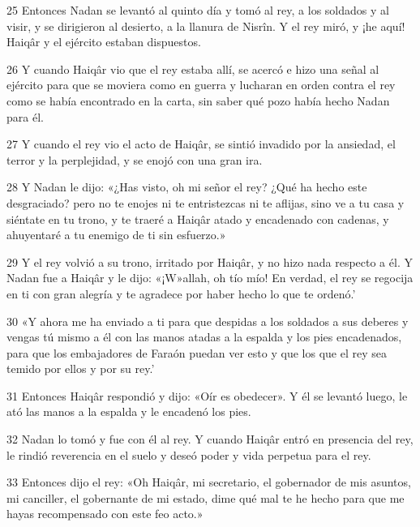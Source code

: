 \par 25 Entonces Nadan se levantó al quinto día y tomó al rey, a los soldados y al visir, y se dirigieron al desierto, a la llanura de Nisrîn. Y el rey miró, y ¡he aquí! Haiqâr y el ejército estaban dispuestos.

\par 26 Y cuando Haiqâr vio que el rey estaba allí, se acercó e hizo una señal al ejército para que se moviera como en guerra y lucharan en orden contra el rey como se había encontrado en la carta, sin saber qué pozo había hecho Nadan para él.

\par 27 Y cuando el rey vio el acto de Haiqâr, se sintió invadido por la ansiedad, el terror y la perplejidad, y se enojó con una gran ira.

\par 28 Y Nadan le dijo: «¿Has visto, oh mi señor el rey? ¿Qué ha hecho este desgraciado? pero no te enojes ni te entristezcas ni te aflijas, sino ve a tu casa y siéntate en tu trono, y te traeré a Haiqâr atado y encadenado con cadenas, y ahuyentaré a tu enemigo de ti sin esfuerzo.»

\par 29 Y el rey volvió a su trono, irritado por Haiqâr, y no hizo nada respecto a él. Y Nadan fue a Haiqâr y le dijo: «¡W»allah, oh tío mío! En verdad, el rey se regocija en ti con gran alegría y te agradece por haber hecho lo que te ordenó.'

\par 30 «Y ahora me ha enviado a ti para que despidas a los soldados a sus deberes y vengas tú mismo a él con las manos atadas a la espalda y los pies encadenados, para que los embajadores de Faraón puedan ver esto y que los que el rey sea temido por ellos y por su rey.'

\par 31 Entonces Haiqâr respondió y dijo: «Oír es obedecer». Y él se levantó luego, le ató las manos a la espalda y le encadenó los pies.

\par 32 Nadan lo tomó y fue con él al rey. Y cuando Haiqâr entró en presencia del rey, le rindió reverencia en el suelo y deseó poder y vida perpetua para el rey.

\par 33 Entonces dijo el rey: «Oh Haiqâr, mi secretario, el gobernador de mis asuntos, mi canciller, el gobernante de mi estado, dime qué mal te he hecho para que me hayas recompensado con este feo acto.»

